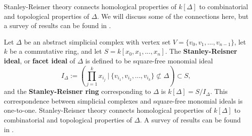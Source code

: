 \documentclass[12pt,leqno]{amsart}
\theoremstyle{definition}
\begin{document}
\noindent
Stanley-Reisner theory connects homological properties of $k[\Delta]$ to combinatorial and topological properties of $\Delta$. We will discuss some of the connections here, but a survey of results can be found in \cites{BH, Stanley, MS}.

Let $\Delta$ be an abstract simplicial complex with vertex set $V = \{v_0,v_1,...,v_{n-1}\}$, let $k$ be a commutative ring, and let $S = k[x_0,x_1,...,x_n]$. The \textbf{Stanley-Reisner ideal}, or \textbf{facet ideal} of $\Delta$ is defined to be square-free monomial ideal
%
\begin{displaymath}
  I_\Delta := \left( \prod_{j=1}^k x_{i_j} \ \bigg\vert \ \{ v_{i_1},v_{i_2},...,v_{i_k} \} \not \subset \Delta \right) \subset S,
\end{displaymath}
%
and the \textbf{Stanley-Reisner ring} corresponding to $\Delta$ is $k[\Delta] = S/I_\Delta$. This correspondence between simplicial complexes and square-free monomial ideals is one-to-one. Stanley-Reisner theory connects homological properties of $k[\Delta]$ to combinatorial and topological properties of $\Delta$. A survey of results can be found in \cite{BH, Stanley, MS}.
\end{document}
